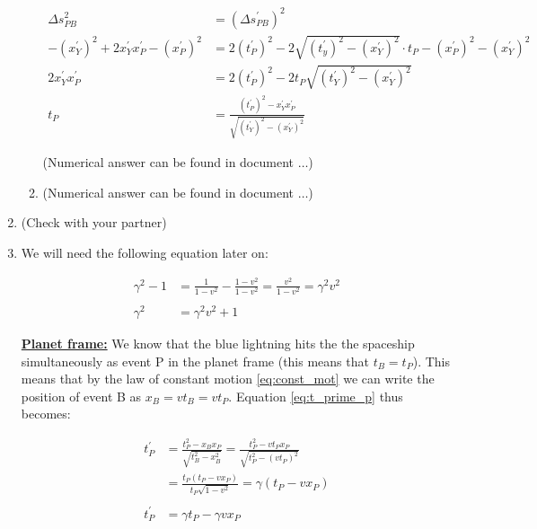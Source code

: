 \documentclass[a4paper,10pt,english]{article}
\begin{document}
\begin{enumerate}
\begin{enumerate}
\begin{align}
\Delta s_{PB}^2&=(\Delta s_{PB}^{\prime})^2 \nonumber\\
-(x_{Y}^{\prime})^2+2x_{Y}^{\prime}x_{P}^{\prime}-(x_{P}^{\prime})^2&=2(t_{P}^{\prime})^{2}-2\sqrt{(t_{y}^{\prime})^2-(x_{Y}^{\prime})^2}\cdot t_{P}-(x_{P}^{\prime})^{2}-(x_{Y}^{\prime})^2 \nonumber\\
2x_{Y}^{\prime}x_{P}^{\prime}&=2(t_{P}^{\prime})^{2}-2t_{P}\sqrt{(t_{Y}^{\prime})^2-(x_{Y}^{\prime})^2} \nonumber\\
t_{P}&=\frac{(t_{P}^{\prime})^{2}-x_{Y}^{\prime}x_{P}^{\prime}}{\sqrt{(t_{Y}^{\prime})^2-(x_{Y}^{\prime})^2}} \label{eq:t_p}
\end{align}

(Numerical answer can be found in document $\ldots$)
\item (Numerical answer can be found in document $\ldots$)
\end{enumerate}

\item (Check with your partner)
\item %
We will need the following equation later on:

\begin{align}
\gamma^{2}-1&=\frac{1}{1-v^{2}}-\frac{1-v^{2}}{1-v^{2}}=\frac{v^{2}}{1-v^{2}}=\gamma^{2}v^{2} \nonumber\\ \nonumber\\
\gamma^{2}&=\gamma^{2}v^{2}+1 \label{eq:gamma_trans}
\end{align}

\underline{\bf{Planet frame:}} We know that the blue lightning hits the the spaceship simultaneously as event P in the planet frame (this means that $t_{B}=t_{P}$). This means that by the law of constant motion \ref{eq:const_mot} we can write the position of event B as $x_{B}=vt_{B}=vt_{P}$. Equation \ref{eq:t_prime_p} thus becomes: 

\begin{align*}
t^{\prime}_{P}&=\frac{t_{P}^{2}-x_{B}x_{P}}{\sqrt{t_{B}^2-x_{B}^2}}=\frac{t_{P}^{2}-vt_{P}x_{P}}{\sqrt{t_{P}^2-(vt_{P})^2}}\\
&=\frac{t_{P}(t_{P}-vx_{P})}{t_{P}\sqrt{1-v^2}}=\gamma(t_{P}-vx_{P})\\
\\
t^{\prime}_{P}&=\gamma t_{P}-\gamma vx_{P}
\end{align*}


\end{enumerate}
\end{document}
